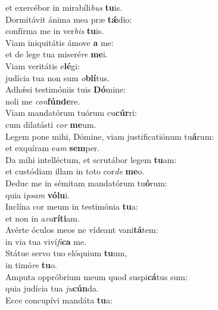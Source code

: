 \oddverse et exercébor in mirabíli\textit{bus} \textbf{tu}is.\\
\evenverse Dormitávit ánima mea præ \textbf{tǽ}dio:~\*\\
\evenverse confírma me in ver\textit{bis} \textbf{tu}is.\\
\oddverse Viam iniquitátis ámove \textbf{a} me:~\*\\
\oddverse et de lege tua miseré\textit{re} \textbf{me}i.\\
\evenverse Viam veritátis e\textbf{lé}gi:~\*\\
\evenverse judícia tua non sum \textit{o}\textbf{blí}tus.\\
\oddverse Adhǽsi testimóniis tuis \textbf{Dó}mine:~\*\\
\oddverse noli me \textit{con}\textbf{fún}\textbf{de}re.\\
\evenverse Viam mandatórum tuórum cu\textbf{cúr}ri:~\*\\
\evenverse cum dilatásti \textit{cor} \textbf{me}um.\\
\oddverse Legem pone mihi, Dómine, viam justificatiónum tu\textbf{á}rum:~\*\\
\oddverse et exquíram e\textit{am} \textbf{sem}per.\\
\evenverse Da mihi intelléctum, et scrutábor legem \textbf{tu}am:~\*\\
\evenverse et custódiam illam in toto cor\textit{de} \textbf{me}o.\\
\oddverse Deduc me in sémitam mandatórum tu\textbf{ó}rum:~\*\\
\oddverse quia i\textit{psam} \textbf{vó}\textbf{lu}i.\\
\evenverse Inclína cor meum in testimónia \textbf{tu}a:~\*\\
\evenverse et non in a\textit{va}\textbf{rí}\textbf{ti}am.\\
\oddverse Avérte óculos meos ne vídeant vani\textbf{tá}tem:~\*\\
\oddverse in via tua viví\textit{fi}\textbf{ca} me.\\
\evenverse Státue servo tuo elóquium \textbf{tu}um,~\*\\
\evenverse in timó\textit{re} \textbf{tu}o.\\
\oddverse Amputa oppróbrium meum quod suspi\textbf{cá}tus sum:~\*\\
\oddverse quia judícia tua \textit{ju}\textbf{cún}da.\\
\evenverse Ecce concupívi mandáta \textbf{tu}a:~\*\\
